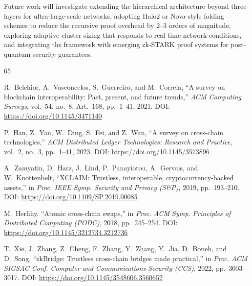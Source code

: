 \documentclass[journal]{IEEEtran}
\begin{document}
Future work will investigate extending the hierarchical architecture beyond three layers for ultra-large-scale networks, adopting Halo2 or Nova-style folding schemes to reduce the recursive proof overhead by 2--3 orders of magnitude, exploring adaptive cluster sizing that responds to real-time network conditions, and integrating the framework with emerging zk-STARK proof systems for post-quantum security guarantees.

\begin{thebibliography}{65}


R.~Belchior, A.~Vasconcelos, S.~Guerreiro, and M.~Correia,
``A survey on blockchain interoperability: Past, present, and future trends,''
\textit{ACM Computing Surveys}, vol.~54, no.~8, Art.\ 168, pp.~1--41, 2021.
\newblock DOI: \url{https://doi.org/10.1145/3471140}

P.~Han, Z.~Yan, W.~Ding, S.~Fei, and Z.~Wan,
``A survey on cross-chain technologies,''
\textit{ACM Distributed Ledger Technologies: Research and Practice}, vol.~2,
no.~3, pp.~1--41, 2023.
\newblock DOI: \url{https://doi.org/10.1145/3573896}


A.~Zamyatin, D.~Harz, J.~Lind, P.~Panayiotou, A.~Gervais, and
W.~Knottenbelt,
``XCLAIM: Trustless, interoperable, cryptocurrency-backed assets,''
in \textit{Proc. IEEE Symp. Security and Privacy (S\&P)}, 2019,
pp.~193--210.
\newblock DOI: \url{https://doi.org/10.1109/SP.2019.00085}

M.~Herlihy,
``Atomic cross-chain swaps,''
in \textit{Proc. ACM Symp. Principles of Distributed Computing (PODC)}, 2018,
pp.~245--254.
\newblock DOI: \url{https://doi.org/10.1145/3212734.3212736}

T.~Xie, J.~Zhang, Z.~Cheng, F.~Zhang, Y.~Zhang, Y.~Jia, D.~Boneh, and
D.~Song,
``zkBridge: Trustless cross-chain bridges made practical,''
in \textit{Proc. ACM SIGSAC Conf. Computer and Communications Security
(CCS)}, 2022, pp.~3003--3017.
\newblock DOI: \url{https://doi.org/10.1145/3548606.3560652}


\end{thebibliography}
\end{document}

